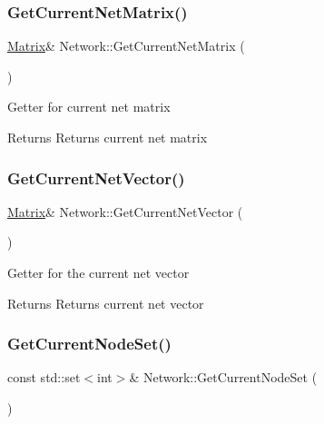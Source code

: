 \mbox{\label{classNetwork_a0d542d208520c286e5418267525c183d}} 
\subsubsection{\texorpdfstring{Get\+Current\+Net\+Matrix()}{GetCurrentNetMatrix()}}
{\footnotesize\ttfamily \hyperlink{classMatrix}{Matrix}\& Network\+::\+Get\+Current\+Net\+Matrix (\begin{DoxyParamCaption}{ }\end{DoxyParamCaption})\hspace{0.3cm}{\ttfamily [inline]}}

Getter for current net matrix \begin{DoxyReturn}{Returns}
Returns current net matrix 
\end{DoxyReturn}
\mbox{\label{classNetwork_a14a99e68dac334d31c127032b24cee0c}} 
\subsubsection{\texorpdfstring{Get\+Current\+Net\+Vector()}{GetCurrentNetVector()}}
{\footnotesize\ttfamily \hyperlink{classMatrix}{Matrix}\& Network\+::\+Get\+Current\+Net\+Vector (\begin{DoxyParamCaption}{ }\end{DoxyParamCaption})\hspace{0.3cm}{\ttfamily [inline]}}

Getter for the current net vector \begin{DoxyReturn}{Returns}
Returns current net vector 
\end{DoxyReturn}
\mbox{\label{classNetwork_a355e3ef39f7178851cb230846d616cef}} 
\subsubsection{\texorpdfstring{Get\+Current\+Node\+Set()}{GetCurrentNodeSet()}}
{\footnotesize\ttfamily const std\+::set$<$int$>$\& Network\+::\+Get\+Current\+Node\+Set (\begin{DoxyParamCaption}{ }\end{DoxyParamCaption})\hspace{0.3cm}{\ttfamily [inline]}}


